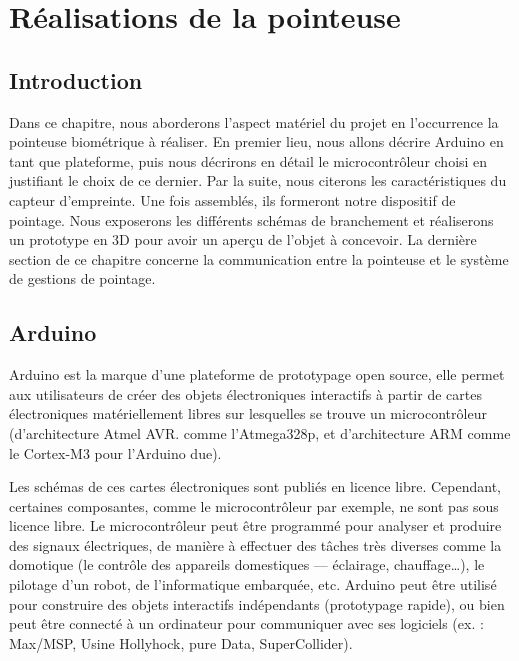 \chapter{Réalisations de la pointeuse}
\renewcommand{\headrulewidth}{1pt}

\section{Introduction}
Dans ce chapitre, nous aborderons l’aspect matériel du projet en l’occurrence la pointeuse biométrique à réaliser. En premier lieu, nous allons décrire Arduino en tant que plateforme, puis nous décrirons en détail le microcontrôleur choisi en justifiant le choix de ce dernier. Par la suite, nous citerons les caractéristiques du capteur d’empreinte. Une fois assemblés, ils formeront notre dispositif de pointage. Nous exposerons les différents schémas de branchement et réaliserons un prototype en 3D pour avoir un aperçu de l’objet à concevoir. 
La dernière section de ce chapitre concerne la communication entre la pointeuse et le système de gestions de pointage.

\section{Arduino}
Arduino est la marque d’une plateforme de prototypage open source, elle permet aux utilisateurs de créer des objets électroniques interactifs à partir de cartes électroniques matériellement libres sur lesquelles se trouve un microcontrôleur (d’architecture Atmel AVR. comme l’Atmega328p, et d’architecture ARM comme le Cortex-M3 pour l’Arduino due).

Les schémas de ces cartes électroniques sont publiés en licence libre. Cependant, certaines composantes, comme le microcontrôleur par exemple, ne sont pas sous licence libre. Le microcontrôleur peut être programmé pour analyser et produire des signaux électriques, de manière à effectuer des tâches très diverses comme la domotique (le contrôle des appareils domestiques — éclairage, chauffage…), le pilotage d’un robot, de l’informatique embarquée, etc. Arduino peut être utilisé pour construire des objets interactifs indépendants (prototypage rapide), ou bien peut être connecté à un ordinateur pour communiquer avec ses logiciels (ex. : Max/MSP, Usine Hollyhock, pure Data, SuperCollider).


